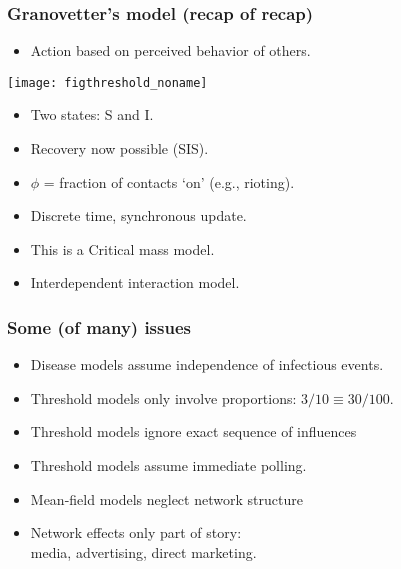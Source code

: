 \begin{frame}
  \frametitle{Granovetter's model (recap of recap)}

  \begin{itemize}
  \item Action based on perceived behavior of others.
  \end{itemize}

  \texttt{[image: figthreshold\_noname]}

  \begin{itemize}
  \item<1-> Two states: S and I.
  \item<1-> Recovery now possible (SIS).
  \item<1-> $\phi$ = fraction of contacts `on' (e.g., rioting).
  \item<1-> Discrete time, synchronous update.
  \item<1-> This is a \alert{Critical mass model}.
  \item<1-> \alert{Inter}dependent interaction model.
  \end{itemize}

\end{frame}

\begin{frame}
  \frametitle{Some (of many) issues}

  \begin{block}{}
    \begin{itemize}
    \item<1-> Disease models assume independence of infectious events.
    \item<2-> Threshold models only involve proportions:
      $3/10 \equiv 30/100$.
    \item<3-> Threshold models ignore exact sequence of influences
    \item<4-> Threshold models assume immediate polling.
    \item<5-> Mean-field models neglect network structure
    \item<6-> Network effects only part of story: \\
      media, advertising, direct marketing.
    \end{itemize}
  \end{block}

\end{frame}


